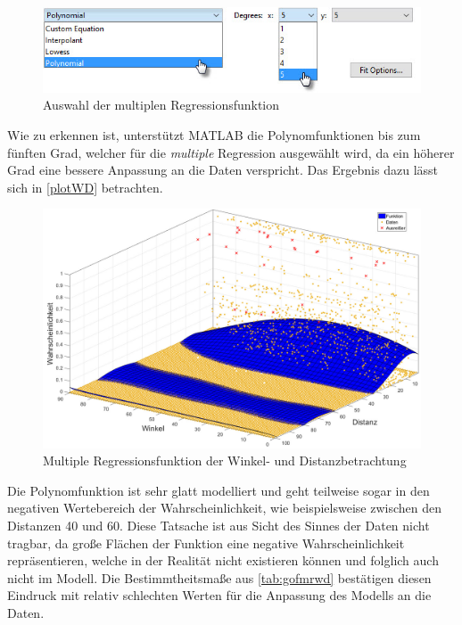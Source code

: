 \begin{figure}[H]
\centering
\includegraphics[scale=0.8]{se-wa-jpg/polyWD}
\caption{Auswahl der multiplen Regressionsfunktion}
\label{polyWD}
\end{figure}

Wie zu erkennen ist, unterstützt MATLAB die Polynomfunktionen bis zum fünften Grad, welcher für die \textit{multiple} Regression ausgewählt wird, da ein höherer Grad eine bessere Anpassung an die Daten verspricht. Das Ergebnis dazu lässt sich in \vref{plotWD} betrachten.

\begin{figure}[H]
\centering
\includegraphics[scale=0.34]{se-wa-jpg/plotWD}
\caption{Multiple Regressionsfunktion der Winkel- und Distanzbetrachtung}
\label{plotWD}
\end{figure}

Die Polynomfunktion ist sehr glatt modelliert und geht teilweise sogar in den negativen Wertebereich der Wahrscheinlichkeit, wie beispielsweise zwischen den Distanzen \textsf{40} und \textsf{60}. Diese Tatsache ist aus Sicht des Sinnes der Daten nicht tragbar, da große Flächen der Funktion eine negative Wahrscheinlichkeit repräsentieren, welche in der Realität nicht existieren können und folglich auch nicht im Modell. Die Bestimmtheitsmaße aus \vref{tab:gofmrwd} bestätigen diesen Eindruck mit relativ schlechten Werten für die Anpassung des Modells an die Daten.

